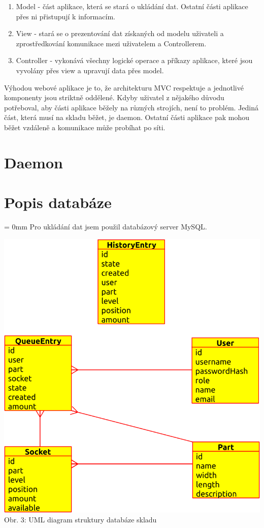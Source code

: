 \documentclass[12pt, a4paper, oneside]{article}
\begin{document}
\begin{enumerate}
\item Model - část aplikace, která se stará o ukládání dat. Ostatní části aplikace přes ni přistupují k informacím.
\item View - stará se o prezentování dat získaných od modelu uživateli a zprostředkování komunikace mezi uživatelem a Controllerem.
\item Controller - vykonává všechny logické operace a příkazy aplikace, které jsou vyvolány přes view a upravují data přes model.
\end{enumerate}

Výhodou webové aplikace je to, že architekturu MVC respektuje a jednotlivé komponenty jsou striktně oddělené. Kdyby uživatel z nějakého důvodu potřeboval, aby části aplikace běžely na různých strojích, není to problém. Jediná část, která musí na skladu běžet, je daemon. Ostatní části aplikace pak mohou běžet vzdáleně a komunikace může probíhat po síti.

\section{Daemon}


\section{Popis databáze}  %
\hoffset = 0mm
Pro ukládání dat jsem použil databázový server MySQL.


\begin{center}
\hspace*{-2cm}
\includegraphics[scale=0.91]{img/entity_diagram.png}
\\
\caption{Obr. 3: UML diagram struktury databáze skladu}
\end{center}
\vspace{2mm}
\end{document}
